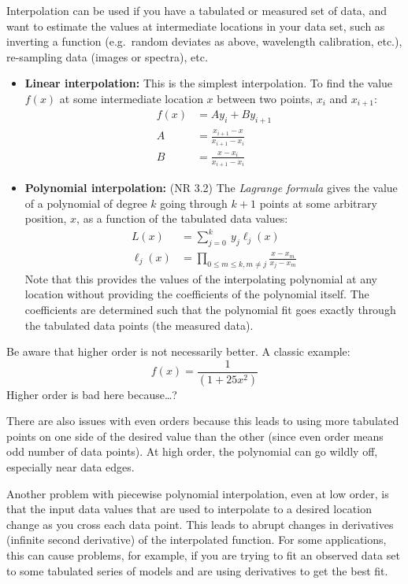 \documentclass{article}
\begin{document}
Interpolation can be used if you have a tabulated or measured set of
data, and want to estimate the values at intermediate locations in your data
set, such as inverting a function (e.g.\ random deviates as above,
wavelength calibration, etc.), re-sampling data (images or spectra), etc.
\begin{itemize}
    \item {\bf Linear interpolation:}
        This is the simplest interpolation. To find the
        value $f(x)$ at some intermediate location
        $x$ between two points, $x_{i}$ and $x_{i+1}$:
        \begin{align*}
            f(x) &= Ay_i + By_{i+1} \\
            A &= \frac{x_{i+1}-x}{x_{i+1}-x_i} \\
            B &= \frac{x-x_i}{x_{i+1}-x_i}
        \end{align*}
    \item {\bf Polynomial interpolation:} (NR 3.2)
        The {\it Lagrange formula} gives the value of a polynomial
        of degree $k$ going through $k+1$ points at some arbitrary position,
        $x$, as a function of the tabulated data values:
        \begin{align*}
            L(x) &= \sum ^k_{j=0} \ y_j \ell_j (x) \\
            \ell_j(x) &= \prod _{0 \leq m \leq k, m \ne j}
            \frac{x-x_m}{x_j - x_m}
        \end{align*}
        Note that this provides the values of the interpolating polynomial at
        any location without providing the coefficients of the polynomial itself.
        The coefficients are determined such that the polynomial fit goes exactly
        through the tabulated data points (the measured data).
\end{itemize}
Be aware that higher order is not necessarily better. A classic example:
$$ f(x) = \frac{1}{(1+25x^{2})} $$
Higher order is bad here because\ldots?

There are also issues with even orders because this leads to using more tabulated
points on one side of the desired value than the other
(since even order means odd number of data points).
At high order, the polynomial can go wildly off, especially near data edges.

Another problem with piecewise polynomial interpolation, even at low order,
is that the input data values that are used to interpolate to a desired
location change as you cross each data point. This leads to abrupt changes
in derivatives (infinite second derivative) of the interpolated function.
For some applications, this can cause problems, for example,
if you are trying to
fit an observed data set to some tabulated series of models and are
using derivatives to get the best fit.
\end{document}
